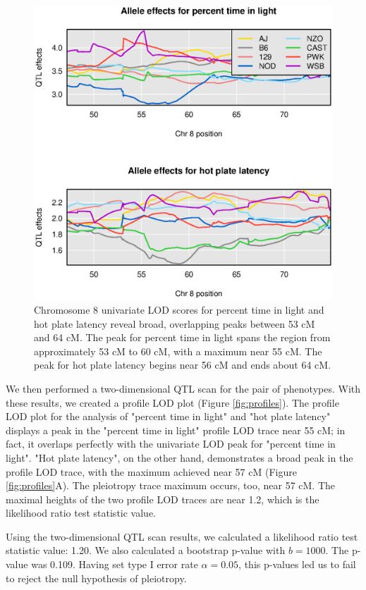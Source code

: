 \documentclass[12pt,twoside, lineno]{gsajnl}
\begin{document}
\begin{figure}
\includegraphics[width = \textwidth]{../Rmd/coefs.eps}
\caption{Chromosome 8 univariate LOD scores for percent time in light and hot plate latency reveal broad, overlapping peaks between 53 cM and 64 cM. The peak for percent time in light spans the region from approximately 53 cM to 60 cM, with a maximum near 55 cM. The peak for hot plate latency begins near 56 cM and ends about 64 cM.}
\label{fig:chr8-effects}
\end{figure}




We then performed a two-dimensional QTL scan for the pair of phenotypes. With these results, we created a profile LOD plot (Figure \ref{fig:profiles}). The profile LOD plot for the analysis of "percent time in light" and "hot plate latency" displays a peak in the "percent time in light" profile LOD trace near 55 cM; in fact, it overlaps perfectly with the univariate LOD peak for "percent time in light". "Hot plate latency", on the other hand, demonstrates a broad peak in the profile LOD trace, with the maximum achieved near 57 cM (Figure \ref{fig:profiles}A). The pleiotropy trace maximum occurs, too, near 57 cM. The maximal heights of the two profile LOD traces are near 1.2, which is the likelihood ratio test statistic value.

Using the two-dimensional QTL scan results, we calculated a likelihood ratio test statistic value: 1.20. We also calculated a bootstrap p-value with $b = 1000$. The p-value was 0.109. Having set type I error rate $\alpha = 0.05$, this p-values led us to fail to reject the null hypothesis of pleiotropy. 
\end{document}
